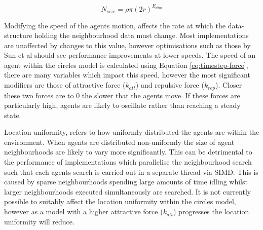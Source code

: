     \begin{equation}\label{eq:neighbourhood-size}
        N_{size} = \rho \pi (2r)^{E_{dim}}
    \end{equation}
      
    Modifying the speed of the agents motion, affects the rate at which the data-structure holding the neighbourhood data must change. Most implementations are unaffected by changes to this value, however optimisations such as those by Sun et al\cite{HY*15} should see performance improvements at lower speeds. The speed of an agent within the circles model is calculated using Equation \ref{eq:timestep-force}, there are many variables which impact this speed, however the most significant modifiers are those of attractive force ($k_{att}$) and repulsive force ($k_{rep}$). Closer these two forces are to $0$ the slower that the agents move. If these forces are particularly high, agents are likely to oscillate rather than reaching a steady state.
    
    Location uniformity, refers to how uniformly distributed the agents are within the environment. When agents are distributed non-uniformly the size of agent neighbourhoods are likely to vary more significantly. This can be detrimental to the performance of implementations which parallelise the neighbourhood search such that each agents search is carried out in a separate thread via SIMD. This is caused by sparse neighbourhoods spending large amounts of time idling whilst larger neighbourhoods executed simultaneously are searched. It is not currently possible to suitably affect the location uniformity within the circles model, however as a model with a higher attractive force ($k_{att}$) progresses the location uniformity will reduce.